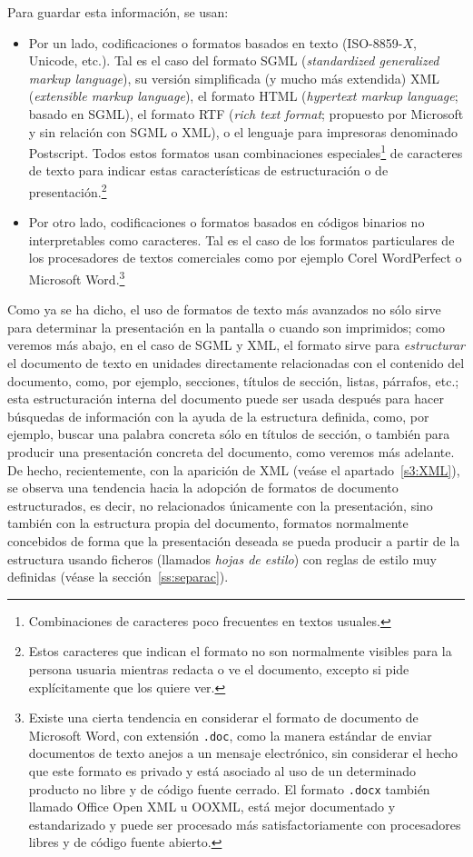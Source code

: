 Para guardar esta información, se usan: \begin{itemize} \item Por un lado, codificaciones o formatos basados en texto (ISO-8859-$X$, Unicode, etc.). Tal es el caso del formato SGML (\emph{standardized generalized markup language}), su versión simplificada (y mucho más extendida) XML (\emph{extensible markup language}), el formato HTML (\emph{hypertext markup language}; basado en SGML), el formato RTF (\emph{rich text format}; propuesto por Microsoft y sin relación con SGML o XML), o el lenguaje para impresoras denominado Postscript. Todos estos formatos usan combinaciones especiales\footnote{Combinaciones de caracteres poco frecuentes en textos usuales.} de caracteres de texto para indicar estas características de estructuración o de presentación.\footnote{Estos caracteres que indican el formato no son normalmente visibles para la persona usuaria mientras redacta o ve el documento, excepto si pide explícitamente que los quiere ver.} \item Por otro lado, codificaciones o formatos basados en códigos binarios no interpretables como caracteres. Tal es el caso de los formatos particulares de los procesadores de textos comerciales como por ejemplo Corel WordPerfect o Microsoft Word.\footnote{Existe una cierta tendencia en considerar el formato de documento de Microsoft Word, con extensión \texttt{.doc}, como la manera estándar de enviar documentos de texto anejos a un mensaje electrónico, sin considerar el hecho que este formato es privado y está asociado al uso de un determinado producto no libre y de código fuente cerrado. El formato \texttt{.docx} también llamado Office Open XML u OOXML, está mejor documentado y estandarizado y puede ser procesado más satisfactoriamente con procesadores libres y de código fuente abierto.} \end{itemize} Como ya se ha dicho, el uso de formatos de texto más avanzados no sólo sirve para determinar la presentación en la pantalla o cuando son imprimidos; como veremos más abajo, en el caso de SGML y XML, el formato sirve para \emph{estructurar} el documento de texto en unidades directamente relacionadas con el contenido del documento, como, por ejemplo, secciones, títulos de sección, listas, párrafos, etc.; esta estructuración interna del documento puede ser usada después para hacer búsquedas de información con la ayuda de la estructura definida, como, por ejemplo, buscar una palabra concreta sólo en títulos de sección, o también para producir una presentación concreta del documento, como veremos más adelante. De hecho, recientemente, con la aparición de XML (veáse el apartado~\ref{s3:XML}), se observa una tendencia hacia la adopción de formatos de documento estructurados, es decir, no relacionados únicamente con la presentación, sino también con la estructura propia del documento, formatos normalmente concebidos de forma que la presentación deseada se pueda producir a partir de la estructura usando ficheros (llamados \emph{hojas de estilo}) con reglas de estilo muy definidas (véase la sección~\ref{ss:separac}). 

